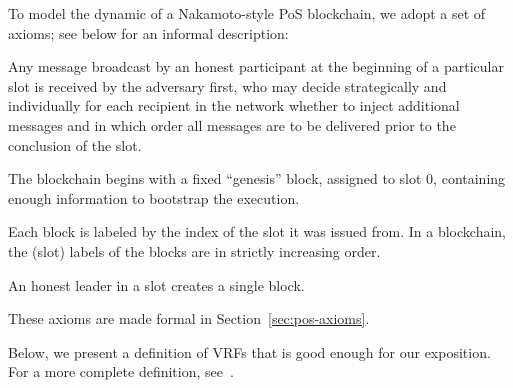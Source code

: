 To model the dynamic of a Nakamoto-style PoS blockchain, 
we adopt a set of axioms; see below for an informal description:

\begin{description}[font=\normalfont\itshape\space]
  \item[Message delivery.] 
    Any message broadcast by an honest participant at the beginning of a
    particular slot is received by the adversary first, who may decide
    strategically and individually for each recipient in the network
    whether to inject additional messages and in which order all messages
    are to be delivered prior to the conclusion of the slot. 

  \item[Genesis block.]
  The blockchain begins with a fixed ``genesis'' block, assigned to slot $0$, 
  containing enough information to bootstrap the execution.
  
  \item[Block label monotonicity.] 
  Each block is labeled by the index of the slot it was issued from. 
  In a blockchain, the (slot) labels of the blocks are in strictly increasing order.

  \item[Honest blocks.] 
  An honest leader in a slot creates a single block.
\end{description}
These axioms are made formal in Section~\ref{sec:pos-axioms}.






Below, we present a definition of VRFs that is good enough for our exposition. 
For a more complete definition, see~\cite{VRF}.


